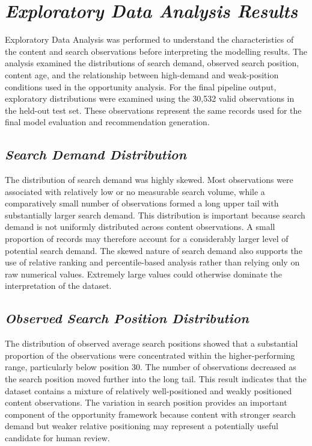 \documentclass[12pt,a4paper]{report}
\begin{document}
\section{\textit{Exploratory Data Analysis Results}}

Exploratory Data Analysis was performed to understand the characteristics of the content and search observations before interpreting the modelling results. The analysis examined the distributions of search demand, observed search position, content age, and the relationship between high-demand and weak-position conditions used in the opportunity analysis. For the final pipeline output, exploratory distributions were examined using the 30,532 valid observations in the held-out test set. These observations represent the same records used for the final model evaluation and recommendation generation.

\subsection{\textit{Search Demand Distribution}}

The distribution of search demand was highly skewed. Most observations were associated with relatively low or no measurable search volume, while a comparatively small number of observations formed a long upper tail with substantially larger search demand. This distribution is important because search demand is not uniformly distributed across content observations. A small proportion of records may therefore account for a considerably larger level of potential search demand. The skewed nature of search demand also supports the use of relative ranking and percentile-based analysis rather than relying only on raw numerical values. Extremely large values could otherwise dominate the interpretation of the dataset.

\subsection{\textit{Observed Search Position Distribution}}

The distribution of observed average search positions showed that a substantial proportion of the observations were concentrated within the higher-performing range, particularly below position 30. The number of observations decreased as the search position moved further into the long tail. This result indicates that the dataset contains a mixture of relatively well-positioned and weakly positioned content observations. The variation in search position provides an important component of the opportunity framework because content with stronger search demand but weaker relative positioning may represent a potentially useful candidate for human review.
\end{document}
